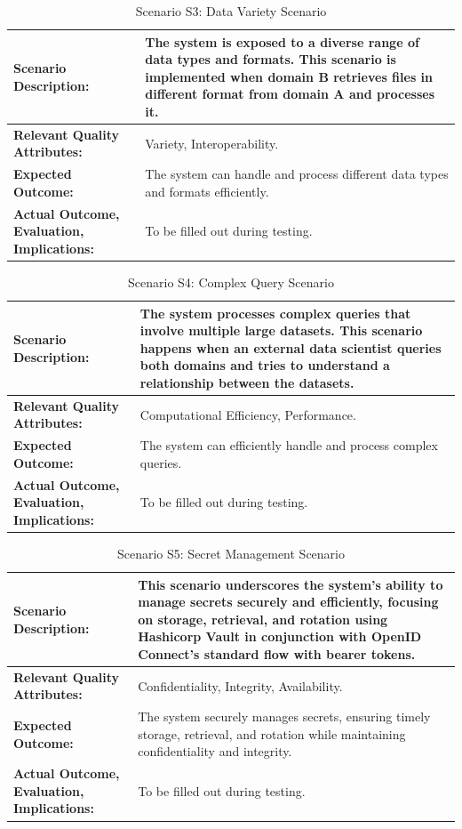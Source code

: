 \documentclass[journal]{IEEEtran}
\begin{document}
\begin{table}[tbp]
  \caption{Scenario S3: Data Variety Scenario}
  \begin{tabularx}{\textwidth}{|>{\raggedright\arraybackslash}p{5cm}|X|}
  \hline
  \textbf{Scenario Description:} & The system is exposed to a diverse range of data types and formats. This scenario is implemented when domain B retrieves files in different format from domain A and processes it. \\
  \hline
  \textbf{Relevant Quality Attributes:} & Variety, Interoperability. \\
  \hline
  \textbf{Expected Outcome:} & The system can handle and process different data types and formats efficiently. \\
  \hline
  \textbf{Actual Outcome, Evaluation, Implications:} & To be filled out during testing. \\
  \hline
  \end{tabularx}
\end{table}

\begin{table}[tbp]
  \caption{Scenario S4: Complex Query Scenario}
  \begin{tabularx}{\textwidth}{|>{\raggedright\arraybackslash}p{5cm}|X|}
  \hline
  \textbf{Scenario Description:} & The system processes complex queries that involve multiple large datasets. This scenario happens when an external data scientist queries both domains and tries to understand a relationship between the datasets. \\
  \hline
  \textbf{Relevant Quality Attributes:} & Computational Efficiency, Performance. \\
  \hline
  \textbf{Expected Outcome:} & The system can efficiently handle and process complex queries. \\
  \hline
  \textbf{Actual Outcome, Evaluation, Implications:} & To be filled out during testing. \\
  \hline
  \end{tabularx}
\end{table}

\begin{table}[tbp]
  \caption{Scenario S5: Secret Management Scenario}
  \begin{tabularx}{\textwidth}{|>{\raggedright\arraybackslash}p{5cm}|X|}
  \hline
  \textbf{Scenario Description:} & This scenario underscores the system's ability to manage secrets securely and efficiently, focusing on storage, retrieval, and rotation using Hashicorp Vault in conjunction with OpenID Connect's standard flow with bearer tokens. \\
  \hline
  \textbf{Relevant Quality Attributes:} & Confidentiality, Integrity, Availability. \\
  \hline
  \textbf{Expected Outcome:} & The system securely manages secrets, ensuring timely storage, retrieval, and rotation while maintaining confidentiality and integrity. \\
  \hline
  \textbf{Actual Outcome, Evaluation, Implications:} & To be filled out during testing. \\
  \hline
  \end{tabularx}
\end{table}
\end{document}
